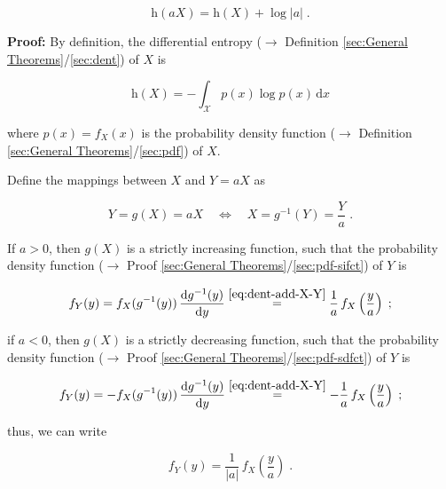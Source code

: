 \documentclass[a4paper,12pt,twoside]{book}
\begin{document}
\begin{equation} \label{eq:dent-add-dent-add}
\mathrm{h}(aX) = \mathrm{h}(X) + \log |a| \; .
\end{equation}


\vspace{1em}
\textbf{Proof:} By definition, the differential entropy ($\rightarrow$ Definition \ref{sec:General Theorems}/\ref{sec:dent}) of $X$ is

\begin{equation} \label{eq:dent-add-X-dent}
\mathrm{h}(X) = - \int_{\mathcal{X}} p(x) \log p(x) \, \mathrm{d}x
\end{equation}

where $p(x) = f_X(x)$ is the probability density function ($\rightarrow$ Definition \ref{sec:General Theorems}/\ref{sec:pdf}) of $X$.

Define the mappings between $X$ and $Y = aX$ as

\begin{equation} \label{eq:dent-add-X-Y}
Y = g(X) = aX \quad \Leftrightarrow \quad X = g^{-1}(Y) = \frac{Y}{a} \; .
\end{equation}

If $a > 0$, then $g(X)$ is a strictly increasing function, such that the probability density function ($\rightarrow$ Proof \ref{sec:General Theorems}/\ref{sec:pdf-sifct}) of $Y$ is

\begin{equation} \label{eq:dent-add-Y-pdf-c1}
f_Y(y) = f_X(g^{-1}(y)) \, \frac{\mathrm{d}g^{-1}(y)}{\mathrm{d}y} \overset{\eqref{eq:dent-add-X-Y}}{=} \frac{1}{a} \, f_X\left(\frac{y}{a}\right) \; ;
\end{equation}

if $a < 0$, then $g(X)$ is a strictly decreasing function, such that the probability density function ($\rightarrow$ Proof \ref{sec:General Theorems}/\ref{sec:pdf-sdfct}) of $Y$ is

\begin{equation} \label{eq:dent-add-Y-pdf-c2}
f_Y(y) = - f_X(g^{-1}(y)) \, \frac{\mathrm{d}g^{-1}(y)}{\mathrm{d}y} \overset{\eqref{eq:dent-add-X-Y}}{=} -\frac{1}{a} \, f_X\left(\frac{y}{a}\right) \; ;
\end{equation}

thus, we can write

\begin{equation} \label{eq:dent-add-Y-pdf}
f_Y(y) = \frac{1}{|a|} \, f_X\left(\frac{y}{a}\right) \; .
\end{equation}
\end{document}
